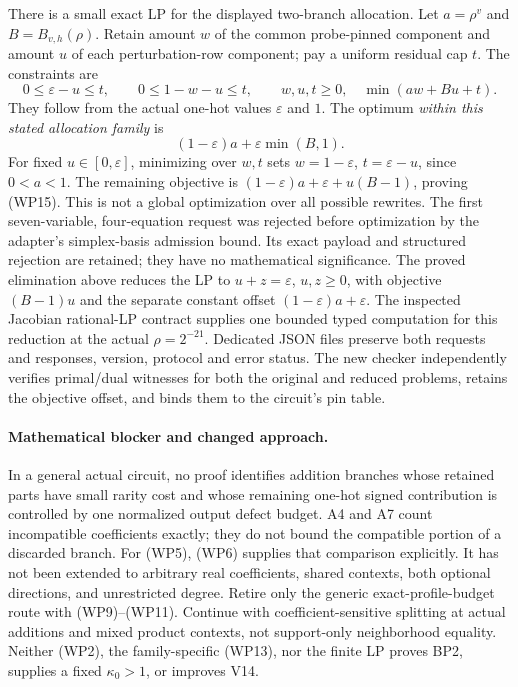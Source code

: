 \documentclass[11pt]{article}
\begin{document}
There is a small exact LP for the displayed two-branch allocation.
Let $a=\rho^v$ and $B=B_{v,h}(\rho)$.
Retain amount $w$ of the common probe-pinned component and amount
$u$ of each perturbation-row component; pay a uniform residual cap $t$.
The constraints are
\[
 0\le\varepsilon-u\le t,\qquad
 0\le1-w-u\le t,\qquad w,u,t\ge0,
 \quad\min(aw+Bu+t).                                   \tag{WP14}
\]
They follow from the actual one-hot values $\varepsilon$ and $1$.
The optimum \emph{within this stated allocation family} is
\[
                (1-\varepsilon)a+\varepsilon\min(B,1). \tag{WP15}
\]
For fixed $u\in[0,\varepsilon]$, minimizing over $w,t$ sets
$w=1-\varepsilon$, $t=\varepsilon-u$, since $0<a<1$.
The remaining objective is
$(1-\varepsilon)a+\varepsilon+u(B-1)$, proving (WP15).
This is not a global optimization over all possible rewrites.
The first seven-variable, four-equation request was rejected before
optimization by the adapter's simplex-basis admission bound.
Its exact payload and structured rejection are retained; they have
no mathematical significance.
The proved elimination above reduces the LP to
$u+z=\varepsilon$, $u,z\ge0$, with objective $(B-1)u$ and the
separate constant offset $(1-\varepsilon)a+\varepsilon$.
The inspected Jacobian rational-LP contract supplies one bounded
typed computation for this reduction at the actual $\rho=2^{-21}$.
Dedicated JSON files preserve both requests and responses, version,
protocol and error status. The new checker independently verifies
primal/dual witnesses for both the original and reduced problems,
retains the objective offset, and binds them to the circuit's pin table.

\paragraph{Mathematical blocker and changed approach.}
In a general actual circuit, no proof identifies addition branches
whose retained parts have small rarity cost and whose remaining
one-hot signed contribution is controlled by one normalized output
defect budget. A4 and A7 count incompatible coefficients exactly;
they do not bound the compatible portion of a discarded branch.
For (WP5), (WP6) supplies that comparison explicitly. It has not
been extended to arbitrary real coefficients, shared contexts,
both optional directions, and unrestricted degree.
Retire only the generic exact-profile-budget route with (WP9)--(WP11).
Continue with coefficient-sensitive splitting at actual additions
and mixed product contexts, not support-only neighborhood equality.
Neither (WP2), the family-specific (WP13), nor the finite LP proves
BP2, supplies a fixed $\kappa_0>1$, or improves V14.
\end{document}
